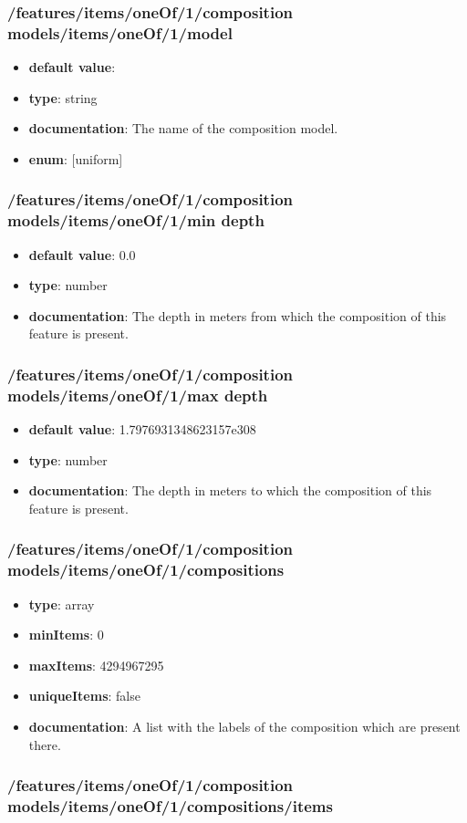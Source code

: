 \subsubsection{/features/items/oneOf/1/composition models/items/oneOf/1/model}
\begin{itemize}\item {\bf default value}: 
\item {\bf type}: string
\item {\bf documentation}: The name of the composition model.
\item {\bf enum}: [uniform]\end{itemize}\subsubsection{/features/items/oneOf/1/composition models/items/oneOf/1/min depth}
\begin{itemize}\item {\bf default value}: 0.0
\item {\bf type}: number
\item {\bf documentation}: The depth in meters from which the composition of this feature is present.
\end{itemize}\subsubsection{/features/items/oneOf/1/composition models/items/oneOf/1/max depth}
\begin{itemize}\item {\bf default value}: 1.7976931348623157e308
\item {\bf type}: number
\item {\bf documentation}: The depth in meters to which the composition of this feature is present.
\end{itemize}\subsubsection{/features/items/oneOf/1/composition models/items/oneOf/1/compositions}
\begin{itemize}\item {\bf type}: array
\item {\bf minItems}: 0
\item {\bf maxItems}: 4294967295
\item {\bf uniqueItems}: false
\item {\bf documentation}: A list with the labels of the composition which are present there.
\end{itemize}\subsubsection{/features/items/oneOf/1/composition models/items/oneOf/1/compositions/items}
